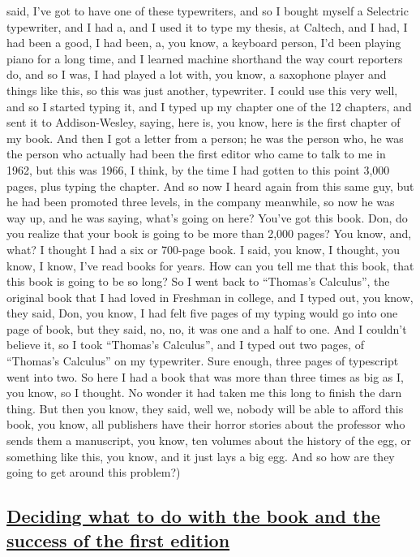 \documentclass[]{article}
\begin{document}
said, I've got to have one of these typewriters, and so I bought myself
a Selectric typewriter, and I had a, and I used it to type my thesis, at
Caltech, and I had, I had been a good, I had been, a, you know, a
keyboard person, I'd been playing piano for a long time, and I learned
machine shorthand the way court reporters do, and so I was, I had played
a lot with, you know, a saxophone player and things like this, so this
was just another, typewriter. I could use this very well, and so I
started typing it, and I typed up my chapter one of the 12 chapters, and
sent it to Addison-Wesley, saying, here is, you know, here is the first
chapter of my book. And then I got a letter from a person; he was the
person who, he was the person who actually had been the first editor who
came to talk to me in 1962, but this was 1966, I think, by the time I
had gotten to this point 3,000 pages, plus typing the chapter. And so
now I heard again from this same guy, but he had been promoted three
levels, in the company meanwhile, so now he was way up, and he was
saying, what's going on here? You've got this book. Don, do you realize
that your book is going to be more than 2,000 pages? You know, and,
what? I thought I had a six or 700-page book. I said, you know, I
thought, you know, I know, I've read books for years. How can you tell
me that this book, that this book is going to be so long? So I went back
to ``Thomas's Calculus'', the original book that I had loved in Freshman
in college, and I typed out, you know, they said, Don, you know, I had
felt five pages of my typing would go into one page of book, but they
said, no, no, it was one and a half to one. And I couldn't believe it,
so I took ``Thomas's Calculus'', and I typed out two pages, of
``Thomas's Calculus'' on my typewriter. Sure enough, three pages of
typescript went into two. So here I had a book that was more than three
times as big as I, you know, so I thought. No wonder it had taken me
this long to finish the darn thing. But then you know, they said, well
we, nobody will be able to afford this book, you know, all publishers
have their horror stories about the professor who sends them a
manuscript, you know, ten volumes about the history of the egg, or
something like this, you know, and it just lays a big egg. And so how
are they going to get around this problem?)

\subsection{\texorpdfstring{\href{http://webofstories.com/play/17098}{Deciding
what to do with the book and the success of the first
edition}}{Deciding what to do with the book and the success of the first edition}}\label{deciding-what-to-do-with-the-book-and-the-success-of-the-first-edition}
\end{document}
